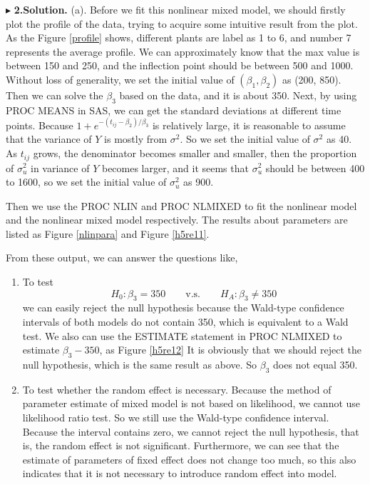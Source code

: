 \documentclass[letterpaper, 12pt]{article}
\begin{document}
$\blacktriangleright$ \textbf{2.\quad Solution.} 
(a). Before we fit this nonlinear mixed model, we should firstly plot the profile of the data, trying to acquire some intuitive result from the plot. As the Figure \ref{profile} shows, different plants are label as 1 to 6, and number 7 represents the average profile. We can approximately know that the max value is between 150 and 250, and the inflection point should be between 500 and 1000. Without loss of generality, we set the initial value of $(\beta_1,\beta_2)$ as (200, 850). Then we can solve the $\beta_3$ based on the data, and it is about 350. Next, by using PROC MEANS in SAS, we can get the standard deviations at different time points. Because $1+e^{-(t_{ij}-\beta_2)/\beta_3}$ is relatively large, it is reasonable to assume that the variance of $Y$ is mostly from $\sigma^2$. So we set the initial value of $\sigma^2$ as 40. As $t_{ij}$ grows, the denominator becomes smaller and smaller, then the proportion of $\sigma_u^2$ in variance of $Y$ becomes larger, and it seems that $\sigma_u^2$ should be between 400 to 1600, so we set the initial value of $\sigma_u^2$ as 900.


Then we use the PROC NLIN and PROC NLMIXED to fit the nonlinear model and the nonlinear mixed model respectively. The results about parameters are listed as Figure \ref{nlinpara} and Figure \ref{h5re11}.

From these output, we can answer the questions like,
\begin{enumerate}
\item To test 
$$
H_0:\beta_3=350\qquad\text{v.s.}\qquad H_A:\beta_3\not=350
$$
we can easily reject the null hypothesis because the Wald-type confidence intervals of both models do not contain 350, which is equivalent to a Wald test. 
We also can use the ESTIMATE statement in PROC NLMIXED to estimate $\beta_3-350$, as Figure \ref{h5re12}
It is obviously that we should reject the null hypothesis, which is the same result as above. So $\beta_3$ does not equal 350.
\item To test whether the random effect is necessary. Because the method of parameter estimate of mixed model is not based on likelihood, we cannot use likelihood ratio test. So we still use the Wald-type confidence interval. Because the interval contains zero, we cannot reject the null hypothesis, that is, the random effect is not significant. Furthermore, we can see that the estimate of parameters of fixed effect does not change too much, so this also indicates that it is not necessary to introduce random effect into model.
\end{enumerate}
\end{document}
